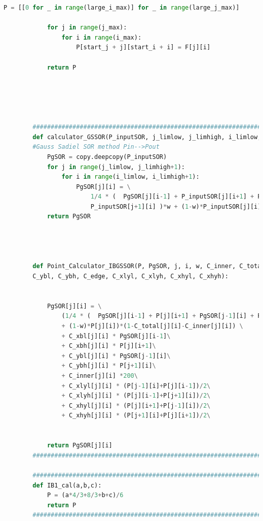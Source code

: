 \documentclass[12pt]{article}
\begin{document}
\begin{scriptsize}
\begin{lstlisting}[language=python,caption={Python code-Potential Flow}]
            P = [[0 for _ in range(large_i_max)] for _ in range(large_j_max)]
        
            for j in range(j_max):
                for i in range(i_max):
                    P[start_j + j][start_i + i] = F[j][i]
        
            return P
                
        
            
        
            
        ##########################################################################################
        def calculator_GSSOR(P_inputSOR, j_limlow, j_limhigh, i_limlow, i_limhigh , w): 
        #Gauss Sadiel SOR method Pin-->Pout
            PgSOR = copy.deepcopy(P_inputSOR)
            for j in range(j_limlow, j_limhigh+1):
                for i in range(i_limlow, i_limhigh+1): 
                    PgSOR[j][i] = \
                        1/4 * (  PgSOR[j][i-1] + P_inputSOR[j][i+1] + PgSOR[j-1][i] + \ 
                        P_inputSOR[j+1][i] )*w + (1-w)*P_inputSOR[j][i]
            return PgSOR
        
        
        
        
        def Point_Calculator_IBGSSOR(P, PgSOR, j, i, w, C_inner, C_total, C_xbl, C_xbh, \ 
        C_ybl, C_ybh, C_edge, C_xlyl, C_xlyh, C_xhyl, C_xhyh):
        
        
            PgSOR[j][i] = \
                (1/4 * (  PgSOR[j][i-1] + P[j][i+1] + PgSOR[j-1][i] + P[j+1][i] )*w \ 
                + (1-w)*P[j][i])*(1-C_total[j][i]-C_inner[j][i]) \
                + C_xbl[j][i] * PgSOR[j][i-1]\
                + C_xbh[j][i] * P[j][i+1]\
                + C_ybl[j][i] * PgSOR[j-1][i]\
                + C_ybh[j][i] * P[j+1][i]\
                + C_inner[j][i] *200\
                + C_xlyl[j][i] * (P[j-1][i]+P[j][i-1])/2\
                + C_xlyh[j][i] * (P[j][i-1]+P[j+1][i])/2\
                + C_xhyl[j][i] * (P[j][i+1]+P[j-1][i])/2\
                + C_xhyh[j][i] * (P[j+1][i]+P[j][i+1])/2\
                
            
            return PgSOR[j][i]
        ##########################################################################################
        
        ##########################################################################################
        def IB1_cal(a,b,c):
            P = (a*4/3+8/3+b+c)/6
            return P
        ##########################################################################################
        

\end{lstlisting}
\end{scriptsize}
\end{document}
